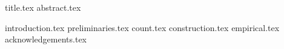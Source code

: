 \documentclass[11pt]{llncs}
\begin{document}
{title.tex}
\thispagestyle{plain}
{abstract.tex}

{introduction.tex}
{preliminaries.tex}
{count.tex}
{construction.tex}
{empirical.tex}
{acknowledgements.tex}


\end{document}
